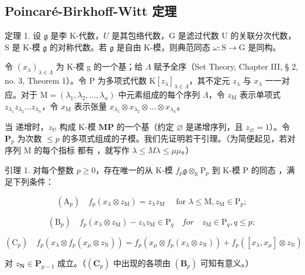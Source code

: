 \subsection{Poincaré-Birkhoff-Witt 定理}

定理 1. 设 \(\mathfrak{g}\) 是李 K-代数，\(U\) 是其包络代数，G 是滤过代数 U 的关联分次代数，S 是 K-模 \(\mathfrak{g}\) 的对称代数。若 \(\mathfrak{g}\) 是自由 K-模，则典范同态 \(\omega: \mathrm{S} \to \mathrm{G}\) 是同构。

令 \((x_{\lambda})_{\lambda \in \Lambda}\) 为 K-模 g 的一个基；给 \(\Lambda\) 赋予全序（Set Theory, Chapter III, § 2, no. 3, Theorem 1）。令 P 为多项式代数 \(\mathrm{K}[z_{\lambda}]_{\lambda \in \Lambda}\)，其不定元 \(z_{\lambda}\) 与 \(x_{\lambda}\) 一一对应。对于 \(\mathrm{M} = (\lambda_1, \lambda_2, \ldots, \lambda_n)\) 中元素组成的每个序列 \(\Lambda\)，令 \(z_{\mathrm{M}}\) 表示单项式 \(z_{\lambda_1}z_{\lambda_2}\ldots z_{\lambda_n}\)，令 \(x_{\mathrm{M}}\) 表示张量 \(x_{\lambda_1}\otimes x_{\lambda_2}\otimes \dots \otimes x_{\lambda_n}\)。

当  递增时，\(z_{\mathbb{M}}\) 构成 K-模 \(\mathbf{M}\)\(\mathbf{P}\) 的一个基（约定 \(\varnothing\) 是递增序列，且 \(z_{\varnothing} = 1\)）。令 \(\mathbf{P}_p\) 为次数 \(\leqslant p\) 的多项式组成的子模。我们先证明若干引理。（为简便起见，若对序列 M 的每个指标  都有 ，就写作 \(\lambda \leqslant M\)\(\lambda \leqslant \mu\)\(\mu\)。）

引理 1. 对每个整数 \(p \geqslant 0\)，存在唯一的从 K-模 \(f_p\)\(\mathfrak{g} \otimes_{\mathbb{K}} \mathrm{P}_p\) 到 K-模 \(\mathrm{P}\) 的同态 ，满足下列条件：

\[
\left(\mathrm{A} _ {p}\right) \quad f _ {p} \left(x _ {\lambda} \otimes z _ {\mathrm{M}}\right) = z _ {\lambda} z _ {\mathrm{M}} \quad \text {   for   } \lambda \leqslant \mathrm{M}, z _ {\mathrm{M}} \in \mathrm{P} _ {p};
\]

\[
\left(\mathrm{B} _ {p}\right) \quad f _ {p} \left(x _ {\lambda} \otimes z _ {\mathrm{M}}\right) - z _ {\lambda} z _ {\mathrm{M}} \in \mathrm{P} _ {q} \quad for \quad z _ {\mathrm{M}} \in \mathrm{P} _ {q}, q \leqslant p;
\]

\[
\left(\mathrm{C} _ {p}\right) \quad f _ {p} \left(x _ {\lambda} \otimes f _ {p} \left(x _ {\mu} \otimes z _ {\mathrm{N}}\right)\right) = f _ {p} \left(x _ {\mu} \otimes f _ {p} \left(x _ {\lambda} \otimes z _ {\mathrm{N}}\right)\right) + f _ {p} \left(\left[ x _ {\lambda}, x _ {\mu} \right] \otimes z _ {\mathrm{N}}\right)
\]

对 \(z_{\mathbf{N}} \in \mathbf{P}_{p-1}\) 成立。（\((\mathbf{C}_p)\) 中出现的各项由 \((\mathbf{B}_p)\) 可知有意义。）


